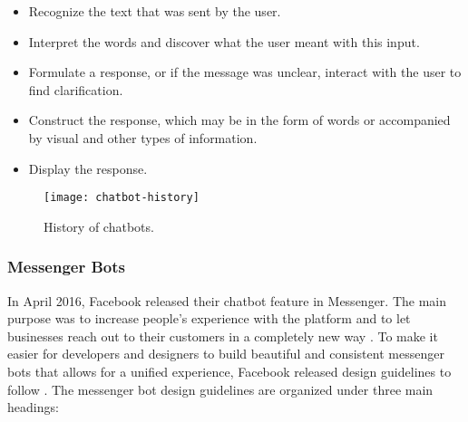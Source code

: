 \begin{itemize}
\item Recognize the text that was sent by the user.
\item Interpret the words and discover what the user meant with this input.
\item Formulate a response, or if the message was unclear, interact with the user to find clarification.
\item Construct the response, which may be in the form of words or accompanied by visual and other types of information.
\item Display the response.
\end{itemize}


\begin{figure}[htb]
	\centering
	\texttt{[image: chatbot-history]}
	\caption{History of chatbots.}
	\label{chatbot-history}
\end{figure}








\subsubsection{Messenger Bots}
In April 2016, Facebook released their chatbot feature in Messenger. The main purpose was to increase people's experience with the platform and to let businesses reach out to their customers in a completely new way \cite{messenger}. To make it easier for developers and designers to build beautiful and consistent messenger bots that allows for a unified experience, Facebook released design guidelines to follow \cite{messenger_guidelines}. The messenger bot design guidelines are organized under three main headings:

